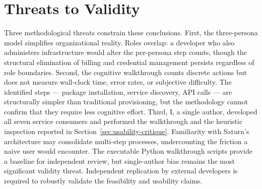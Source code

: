\section{Threats to Validity}
\label{sec:eval-threats}

Three methodological threats constrain these conclusions. First, the three-persona model simplifies organizational reality. Roles overlap: a developer who also administers infrastructure would alter the per-persona step counts, though the structural elimination of billing and credential management persists regardless of role boundaries. Second, the cognitive walkthrough counts discrete actions but does not measure wall-clock time, error rates, or subjective difficulty. The identified steps --- package installation, service discovery, API calls --- are structurally simpler than traditional provisioning, but the methodology cannot confirm that they require less cognitive effort. Third, I, a single author, developed all seven service consumers and performed the walkthrough and the heuristic inspection reported in Section~\ref{sec:usability-critique}. Familiarity with Saturn’s architecture may consolidate multi-step processes, undercounting the friction a naive user would encounter. The executable Python walkthrough scripts provide a baseline for independent review, but single-author bias remains the most significant validity threat. Independent replication by external developers is required to robustly validate the feasibility and usability claims.

